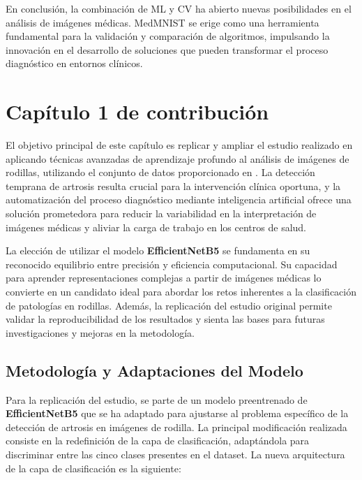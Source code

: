 \documentclass[11pt,spanish,listoffigures,listoftables]{tfgetsinf}
\begin{document}
En conclusión, la combinación de ML y CV ha abierto nuevas posibilidades en el análisis de imágenes médicas. MedMNIST se erige como una herramienta fundamental para la validación y comparación de algoritmos, impulsando la innovación en el desarrollo de soluciones que pueden transformar el proceso diagnóstico en entornos clínicos.



\chapter{Capítulo 1 de contribución}  %

El objetivo principal de este capítulo es replicar y ampliar el estudio realizado en \cite{10863523} aplicando técnicas avanzadas de aprendizaje profundo al análisis de imágenes de rodillas, utilizando el conjunto de datos proporcionado en \cite{chen2018knee}. La detección temprana de artrosis resulta crucial para la intervención clínica oportuna, y la automatización del proceso diagnóstico mediante inteligencia artificial ofrece una solución prometedora para reducir la variabilidad en la interpretación de imágenes médicas y aliviar la carga de trabajo en los centros de salud.

La elección de utilizar el modelo \textbf{EfficientNetB5} se fundamenta en su reconocido equilibrio entre precisión y eficiencia computacional. Su capacidad para aprender representaciones complejas a partir de imágenes médicas lo convierte en un candidato ideal para abordar los retos inherentes a la clasificación de patologías en rodillas. Además, la replicación del estudio original permite validar la reproducibilidad de los resultados y sienta las bases para futuras investigaciones y mejoras en la metodología.

\section{Metodología y Adaptaciones del Modelo}
Para la replicación del estudio, se parte de un modelo preentrenado de \textbf{EfficientNetB5} que se ha adaptado para ajustarse al problema específico de la detección de artrosis en imágenes de rodilla. La principal modificación realizada consiste en la redefinición de la capa de clasificación, adaptándola para discriminar entre las cinco clases presentes en el dataset. La nueva arquitectura de la capa de clasificación es la siguiente:
\end{document}
